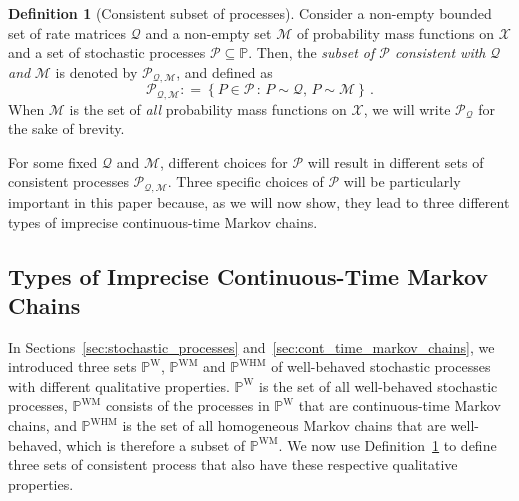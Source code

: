 \documentclass[10pt,a4paper]{paper}
\theoremstyle{definition}
\newtheorem{definition}{Definition}
\newcommand{\states}{\mathcal{X}}
\newcommand{\processes}{\mathbb{P}}
\newcommand{\wprocesses}{\processes^{\mathrm{W}}}
\newcommand{\wmprocesses}{\processes^{\mathrm{WM}}}
\newcommand{\whmprocesses}{\processes^{\mathrm{WHM}}}
\newcommand{\rateset}{\mathcal{Q}}
\newcommand{\coloneqq}{:\!=}
\newcommand{\ictmc}{{ICTMC}}
\begin{document}
\begin{definition}[Consistent subset of processes]\label{def:consistent_process_set}
Consider a non-empty bounded set of rate matrices $\rateset$ and a non-empty set $\mathcal{M}$ of probability mass functions on $\states$ and a set of stochastic processes $\mathcal{P}\subseteq\processes$. Then, the \emph{subset of $\mathcal{P}$ consistent with} $\rateset$ \emph{and} $\mathcal{M}$ is denoted by $\mathcal{P}_{\rateset,\mathcal{M}}$, and defined as
\begin{equation*}
\mathcal{P}_{\rateset,\mathcal{M}} \coloneqq \left\{P\in\mathcal{P}\,:\,P\sim\rateset,\,P\sim\mathcal{M}\right\}\,.
\end{equation*}
When $\mathcal{M}$ is the set of \emph{all} probability mass functions on $\states$, we will write $\mathcal{P}_{\rateset}$ for the sake of brevity.
\end{definition}
For some fixed $\mathcal{Q}$ and $\mathcal{M}$, different choices for $\mathcal{P}$ will result in different sets of consistent processes $\mathcal{P}_{\rateset,\mathcal{M}}$. Three specific choices of $\mathcal{P}$ will be particularly important in this paper because, as we will now show, they lead to three different types of imprecise continuous-time Markov chains.



\subsection{Types of Imprecise Continuous-Time Markov Chains}\label{subsec:types_ictmc}

In Sections~\ref{sec:stochastic_processes} and~\ref{sec:cont_time_markov_chains}, we introduced three sets $\wprocesses$, $\wmprocesses$ and $\whmprocesses$ of well-behaved stochastic processes with different qualitative properties. $\wprocesses$ is the set of all well-behaved stochastic processes, $\wmprocesses$ consists of the processes in $\wprocesses$ that are continuous-time Markov chains, and $\whmprocesses$ is the set of all homogeneous Markov chains that are well-behaved, which is therefore a subset of $\wmprocesses$. We now use Definition~\ref{def:consistent_process_set} to define three sets of consistent process that also have these respective qualitative properties. 
\end{document}
